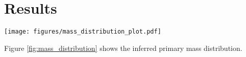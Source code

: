 \section{Results} \label{sec:results}

\begin{figure*}[ht!]
    \begin{centering}
        \texttt{[image: figures/mass\_distribution\_plot.pdf]}
        \caption{The marginal primary mass distribution}
        \label{fig:mass_distribution}
    \end{centering}
\end{figure*}

Figure \ref{fig:mass_distribution} shows the inferred primary mass distribution. 